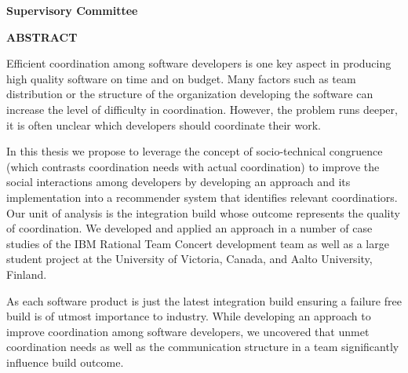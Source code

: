 \newpage
{}

\noindent \textbf{Supervisory Committee}
\tpbreak
\panel

\begin{center}
\textbf{ABSTRACT}
\end{center}
Efficient coordination among software developers is one key aspect in producing high quality software on time and on budget.
Many factors such as team distribution or the structure of the organization developing the software can increase the level of difficulty in coordination.
However, the problem runs deeper, it is often unclear which developers should coordinate their work.

In this thesis we propose to leverage the concept of socio-technical congruence (which contrasts coordination needs with actual coordination) to improve the social interactions among developers 
by developing an approach and its implementation into a recommender system that identifies relevant coordinatiors.
Our unit of analysis is the integration build whose outcome represents the quality of coordination.
We developed and applied an approach in a number of case studies of the IBM Rational Team Concert development team as well as a large student project at the University of Victoria, Canada, and Aalto University, Finland.

As each software product is just the latest integration build ensuring a failure free build is of utmost importance to industry.
While developing an approach to improve coordination among software developers, we uncovered that unmet coordination needs as well as the communication structure in a team significantly influence build outcome.